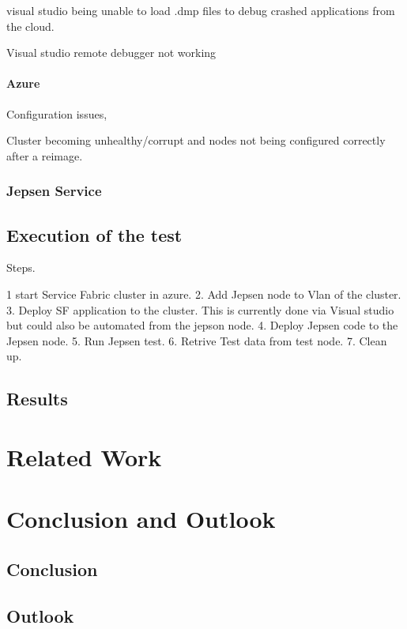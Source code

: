 \documentclass[a4paper,10pt,titlepage]{report}
\begin{document}
visual studio being unable to load .dmp files to debug crashed applications from the cloud.

Visual studio remote debugger not working

\subsubsection{Azure}

Configuration issues,

Cluster becoming unhealthy/corrupt and nodes not being configured correctly after a reimage.


\subsection{Jepsen Service}


\section{Execution of the test}

Steps.

1 start Service Fabric cluster in azure.
2. Add Jepsen node to Vlan of the cluster.
3. Deploy SF application to the cluster. This is currently done via Visual studio but could also be automated from the jepson node.
4. Deploy Jepsen code to the Jepsen node.
5. Run Jepsen test.
6. Retrive Test data from test node.
7. Clean up.


\section{Results}





\chapter{Related Work}

\chapter{Conclusion and Outlook}
\section*{Conclusion}

\section*{Outlook}
\end{document}
